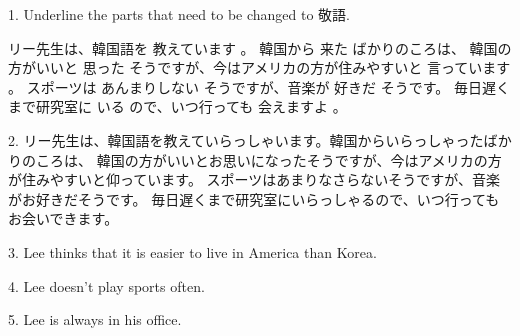 \par{1. Underline the parts that need to be changed to 敬語. }

\par{ リー先生は、韓国語を 教えています 。 韓国から 来た ばかりのころは、 \hfill\break
 韓国の方がいいと 思った そうですが、今はアメリカの方が住みやすいと 言っています 。 \hfill\break
 スポーツは あんまりしない そうですが、音楽が 好きだ そうです。 \hfill\break
 毎日遅くまで研究室に いる ので、いつ行っても 会えますよ 。 }

\par{2.  リー先生は、韓国語を教えていらっしゃいます。韓国からいらっしゃったばかりのころは、 \hfill\break
 韓国の方がいいとお思いになったそうですが、今はアメリカの方が住みやすいと仰っています。 \hfill\break
 スポーツはあまりなさらないそうですが、音楽がお好きだそうです。 \hfill\break
 毎日遅くまで研究室にいらっしゃるので、いつ行ってもお会いできます。 }

\par{3. Lee thinks that it is easier to live in America than Korea. }

\par{4. Lee doesn't play sports often. }

\par{5. Lee is always in his office. }
    